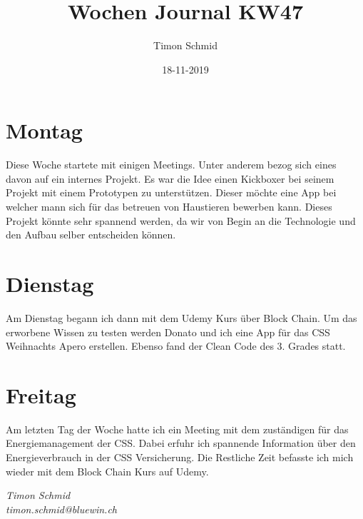 \documentclass[12pt, titlepage]{article}
\title{Wochen Journal KW47}
\date{18-11-2019}
\author{Timon Schmid}
\begin{document}
  \maketitle

  \newpage


  \section{Montag}
  Diese Woche startete mit einigen Meetings. Unter anderem bezog sich eines
  davon auf ein internes Projekt. Es war die Idee einen Kickboxer bei seinem
  Projekt mit einem Prototypen zu unterstützen. Dieser möchte eine App bei
  welcher mann sich für das betreuen von Haustieren bewerben kann. Dieses
  Projekt könnte sehr spannend werden, da wir von Begin an die Technologie
  und den Aufbau selber entscheiden können.

  \section{Dienstag}
  Am Dienstag begann ich dann mit dem Udemy Kurs über Block Chain. Um das
  erworbene Wissen zu testen werden Donato und ich eine App für das CSS
  Weihnachts Apero erstellen. Ebenso fand der Clean Code des 3. Grades statt.

  \section{Freitag}
  Am letzten Tag der Woche hatte ich ein Meeting mit dem zuständigen für
  das Energiemanagement der CSS. Dabei erfuhr ich spannende Information
  über den Energieverbrauch in der CSS Versicherung. Die Restliche Zeit
  befasste ich mich wieder mit dem Block Chain Kurs auf Udemy.

  \vspace*{\fill}
  \hfill \break
  \textit{Timon Schmid \\ timon.schmid@bluewin.ch}
\end{document}
